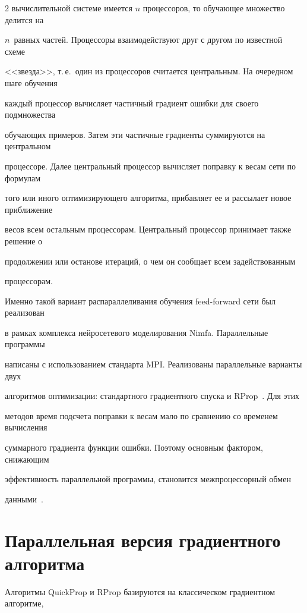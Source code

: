 \begin{multicols}{2}
вычислительной системе имеется $n$ процессоров, то обучающее множество делится на


$n$~равных частей. Процессоры взаимодействуют друг с другом по известной схеме


<<звезда>>, т.\,е.\ один из процессоров считается центральным. На очередном шаге обучения


каждый процессор вычисляет частичный градиент ошибки для своего подмножества


обучающих примеров. Затем эти частичные градиенты суммируются на центральном


процессоре. Далее центральный процессор вычисляет поправку к весам сети по формулам


того или иного оптимизирующего алгоритма, прибавляет ее и рассылает новое приближение


весов всем остальным процессорам. Центральный процессор принимает также решение о


продолжении или останове итераций, о чем он сообщает всем задействованным


процессорам.





 Именно такой вариант распараллеливания обуче\-ния feed-forward сети был реализован


в рамках комплекса нейросетевого моделирования Nimfa. Параллельные программы


написаны с использованием стандарта MPI. Реализованы параллельные варианты двух


алгоритмов оптимизации: стандартного градиентного спуска и RProp~\cite{12kr}. Для этих


методов время подсчета поправки к весам мало по сравнению со временем вычисления


суммарного градиента функции ошибки. Поэтому основным фактором, снижающим


эффективность параллельной программы, становится межпроцессорный обмен


данными~\cite{5kr}.





\section{Параллельная версия градиентного алгоритма}





 Алгоритмы QuickProp и RProp базируются на классическом градиентном алгоритме,



\end{multicols}
